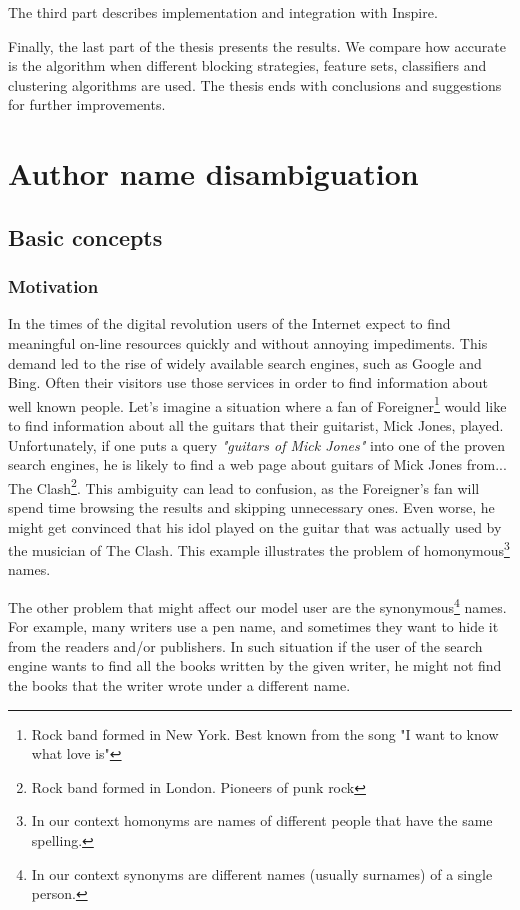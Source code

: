\documentclass{pracamgr}
\begin{document}
The third part describes implementation and integration with Inspire.

Finally, the last part of the thesis presents the results. We compare how accurate is the
algorithm when different blocking strategies, feature sets, classifiers and clustering
algorithms are used. The thesis ends with conclusions and suggestions for further improvements.

\part{Author name disambiguation}\label{r:pojecia}

\chapter{Basic concepts}

\section{Motivation}
In the times of the digital revolution users of the Internet expect to find meaningful
on-line resources quickly and without annoying impediments. This demand led to the
rise of widely available search engines, such as Google and Bing. Often their visitors
use those services in order to find information about well known people. Let's imagine
a situation where a fan of Foreigner\footnote{Rock band formed in New York. Best known
from the song "I want to know what love is"} would like to find information about all
the guitars that their guitarist, Mick Jones, played. Unfortunately, if one puts a
query \emph{"guitars of Mick Jones"} into one of the proven search engines, he is likely
to find a web page about guitars of Mick Jones from... The Clash\footnote{Rock band
formed in London. Pioneers of punk rock}. This ambiguity can lead to confusion, as the
Foreigner's fan will spend time browsing the results and skipping unnecessary ones.
Even worse, he might get convinced that his idol played on the guitar that was actually
used by the musician of The Clash. This example illustrates the problem of
homonymous\footnote{In our context homonyms are names of different people that have
the same spelling.} names.

The other problem that might affect our model user are the synonymous\footnote{In
our context synonyms are different names (usually surnames) of a single person.} names.
For example, many writers use a pen name, and sometimes they want to hide it from the
readers and/or publishers. In such situation if the user of the search engine wants to
find all the books written by the given writer, he might not find the books that the
writer wrote under a different name. 
\end{document}
